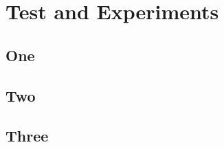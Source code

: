 
\chapter{Test and Experiments}
\begin{spacing}{1.5}
\setlength{\parskip}{0.3in}

\section{One}


\section{Two}

\section{Three}


\end{spacing}
\newpage
